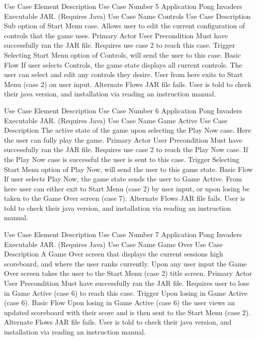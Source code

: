 \documentclass[12pt, titlepage]{article}
\begin{document}
Use Case Element
Description
Use Case Number
5
Application
Pong Invaders Executable JAR. (Requires Java)
Use Case Name
Controls
Use Case Description
Sub option of Start Menu case. Allows user to edit the current configuration of controls that the game uses.
Primary Actor
User 
Precondition
Must have successfully ran the JAR file. Requires use case 2 to reach this case.
Trigger
Selecting Start Menu option of Controls, will send the user to this case.
Basic Flow
If user selects Controls, the game state displays all current controls. The user can select and edit any controls they desire. User from here exits to Start Menu (case 2) on user input.
Alternate Flows
JAR file fails. User is told to check their java version, and installation via reading an instruction manual.


Use Case Element
Description
Use Case Number
6
Application
Pong Invaders Executable JAR. (Requires Java)
Use Case Name
Game Active
Use Case Description
The active state of the game upon selecting the Play Now case. Here the user can fully play the game.
Primary Actor
User 
Precondition
Must have successfully ran the JAR file. Requires use case 2 to reach the Play Now case. If the Play Now case is successful the user is sent to this case.
Trigger
Selecting Start Menu option of Play Now, will send the user to this game state.
Basic Flow
If user selects Play Now, the game state sends the user to Game Active. From here user can either exit to Start Menu (case 2) by user input, or upon losing be taken to the Game Over screen (case 7).
Alternate Flows
JAR file fails. User is told to check their java version, and installation via reading an instruction manual.



Use Case Element
Description
Use Case Number
7
Application
Pong Invaders Executable JAR. (Requires Java)
Use Case Name
Game Over
Use Case Description
A Game Over screen that displays the current sessions high scoreboard, and where the user ranks currently. Upon any user input the Game Over screen takes the user to the Start Menu (case 2) title screen.
Primary Actor
User 
Precondition
Must have successfully ran the JAR file. Requires user to lose in Game Active (case 6) to reach this case.
Trigger
Upon losing in Game Active (case 6).
Basic Flow
Upon losing in Game Active (case 6) the user views an updated scoreboard with their score and is then sent to the Start Menu (case 2).
Alternate Flows
JAR file fails. User is told to check their java version, and installation via reading an instruction manual.
\end{document}
